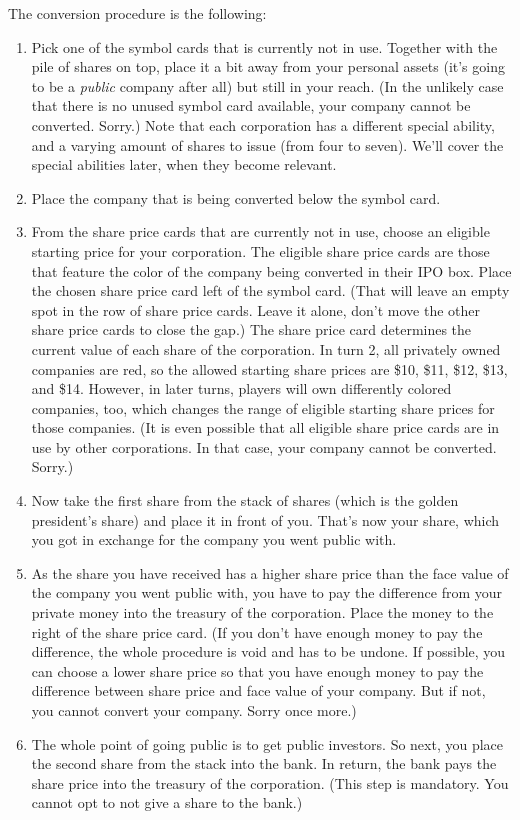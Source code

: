 \documentclass[10pt,final]{report}
\begin{document}
\begin{multicols}{2}
The conversion procedure is the following:
\begin{enumerate}
\item Pick one of the symbol cards that is currently not in
  use. Together with the pile of shares on top, place it a bit away
  from your personal assets (it's going to be a \emph{public} company
  after all) but still in your reach. (In the unlikely case that there
  is no unused symbol card available, your company cannot be
  converted. Sorry.) Note that each corporation has a different
  special ability, and a varying amount of shares to issue (from four
  to seven). We'll cover the special abilities later, when they become
  relevant.
\item Place the company that is being converted below the symbol card.
\item From the share price cards that are currently not in use, choose
  an eligible starting price for your corporation. The eligible share
  price cards are those that feature the color of the company being
  converted in their IPO box. Place the chosen share price card left
  of the symbol card. (That will leave an empty spot in the row of
  share price cards. Leave it alone, don't move the other share price
  cards to close the gap.) The share price card determines the current
  value of each share of the corporation.  In turn 2, all privately
  owned companies are red, so the allowed starting share prices are
  \$10, \$11, \$12, \$13, and \$14. However, in later turns, players
  will own differently colored companies, too, which changes the range
  of eligible starting share prices for those companies. (It is even
  possible that all eligible share price cards are in use by other
  corporations. In that case, your company cannot be
  converted. Sorry.)
\item Now take the first share from the stack of shares (which is the
  golden president's share) and place it in front of you. That's now
  your share, which you got in exchange for the company you went
  public with.
\item As the share you have received has a higher share price than the
  face value of the company you went public with, you have to pay the
  difference from your private money into the treasury of the
  corporation. Place the money to the right of the share price
  card. (If you don't have enough money to pay the difference, the
  whole procedure is void and has to be undone. If possible, you can
  choose a lower share price so that you have enough money to pay the
  difference between share price and face value of your company. But
  if not, you cannot convert your company. Sorry once more.)
\item The whole point of going public is to get public investors. So
  next, you place the second share from the stack into the bank. In
  return, the bank pays the share price into the treasury of the
  corporation. (This step is mandatory. You cannot opt to not give a
  share to the bank.)
\end{enumerate}


\end{multicols}
\end{document}
